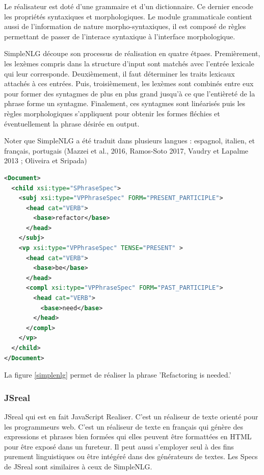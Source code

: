 Le réalisateur est doté d'une grammaire et d'un dictionnaire. Ce dernier encode les propriétés syntaxiques et morphologiques. Le module grammaticale contient aussi de l'information de nature morpho-syntaxiques, il est composé de règles permettant de passer de l'interace syntaxique à l'interface morphologique.

SimpleNLG découpe son processus de réalisation en quatre étpaes. Premièrement, les lexèmes compris dans la structure d'input sont matchés avec l'entrée lexicale qui leur corresponde. Deuxièmement, il faut déterminer les traits lexicaux attachés à ces entrées. Puis, troisièmement, les lexèmes sont combinés entre eux pour former des syntagmes de plus en plus grand jusqu'à ce que l'entièreté de la phrase forme un syntagme. Finalement, ces syntagmes sont linéarisés puis les règles morphologiques s'appliquent pour obtenir les formes fléchies et éventuellement la phrase désirée en output.

Noter que SimpleNLG a été traduit dans plusieurs langues : espagnol, italien, et français, portugais (Mazzei et al., 2016, Ramos-Soto 2017, Vaudry et Lapalme 2013 ; Oliveira et Sripada)

\begin{lstlisting}[language=Xml, caption=Structure d'input dans SimpleNLG, label=simplenlg]
<Document>
  <child xsi:type="SPhraseSpec">
    <subj xsi:type="VPPhraseSpec" FORM="PRESENT_PARTICIPLE">
      <head cat="VERB">
        <base>refactor</base>
      </head>
    </subj>
    <vp xsi:type="VPPhraseSpec" TENSE="PRESENT" >
      <head cat="VERB">
        <base>be</base>
      </head>
      <compl xsi:type="VPPhraseSpec" FORM="PAST_PARTICIPLE">
        <head cat="VERB">
          <base>need</base>
        </head>
      </compl>
    </vp>
  </child>
</Document>
\end{lstlisting}
La figure \ref{simplenlg} permet de réaliser la phrase 'Refactoring is needed.'

\subsubsection{JSreal}
JSreal \citep{DaoustJSREALTextRealizer2015} qui est en fait JavaScript Realiser. C'est un réaliseur de texte orienté pour les programmeurs web. C'est un réaliseur de texte en français qui génère des expressions et phrases bien formées qui elles peuvent être formattées en HTML pour être exposé dans un fureteur. Il peut aussi s'employer seul à des fins purement linguistiques ou être intégéré dans des générateurs de textes. Les Specs de JSreal sont similaires à ceux de SimpleNLG.

